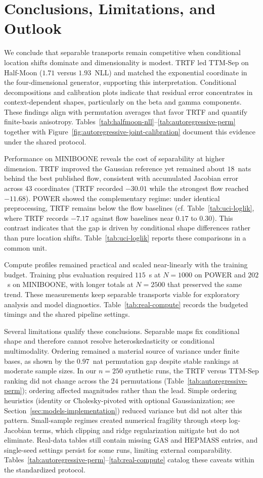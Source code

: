 \documentclass[11pt,a4paper,twoside]{book}\usepackage[]{graphicx}\usepackage[]{xcolor}
\begin{document}
\section{Conclusions, Limitations, and Outlook}\label{sec:conclusion-outlook}
We conclude that separable transports remain competitive when conditional location shifts dominate and dimensionality is modest. TRTF led TTM-Sep on Half-Moon ($1.71$ versus $1.93$~NLL) and matched the exponential coordinate in the four-dimensional generator, supporting this interpretation. Conditional decompositions and calibration plots indicate that residual error concentrates in context-dependent shapes, particularly on the beta and gamma components. These findings align with permutation averages that favor TRTF and quantify finite-basis anisotropy. Tables~\ref{tab:halfmoon-nll}--\ref{tab:autoregressive-perm} together with Figure~\ref{fig:autoregressive-joint-calibration} document this evidence under the shared protocol.

Performance on MINIBOONE reveals the cost of separability at higher dimension. TRTF improved the Gaussian reference yet remained about $18$~nats behind the best published flow, consistent with accumulated Jacobian error across $43$ coordinates (TRTF recorded $-30.01$ while the strongest flow reached $-11.68$). POWER showed the complementary regime: under identical preprocessing, TRTF remains below the flow baselines (cf. Table~\ref{tab:uci-loglik}, where TRTF records $-7.17$ against flow baselines near $0.17$ to $0.30$). This contrast indicates that the gap is driven by conditional shape differences rather than pure location shifts. Table~\ref{tab:uci-loglik} reports these comparisons in a common unit.

Compute profiles remained practical and scaled near-linearly with the training budget. Training plus evaluation required $115$~s at $N=1000$ on POWER and $202$~s on MINIBOONE, with longer totals at $N=2500$ that preserved the same trend. These measurements keep separable transports viable for exploratory analysis and model diagnostics. Table~\ref{tab:real-compute} records the budgeted timings and the shared pipeline settings.

Several limitations qualify these conclusions. Separable maps fix conditional shape and therefore cannot resolve heteroskedasticity or conditional multimodality. Ordering remained a material source of variance under finite bases, as shown by the $0.97$~nat permutation gap despite stable rankings at moderate sample sizes. In our $n=250$ synthetic runs, the TRTF versus TTM-Sep ranking did not change across the $24$ permutations (Table~\ref{tab:autoregressive-perm}); ordering affected magnitudes rather than the lead. Simple ordering heuristics (identity or Cholesky-pivoted with optional Gaussianization; see Section~\ref{sec:models-implementation}) reduced variance but did not alter this pattern. Small-sample regimes created numerical fragility through steep log-Jacobian terms, which clipping and ridge regularization mitigate but do not eliminate. Real-data tables still contain missing GAS and HEPMASS entries, and single-seed settings persist for some runs, limiting external comparability. Tables~\ref{tab:autoregressive-perm}--\ref{tab:real-compute} catalog these caveats within the standardized protocol.
\end{document}
